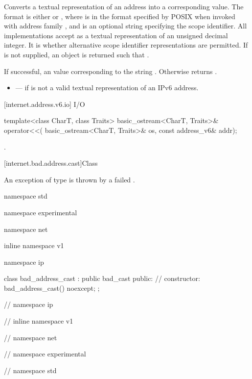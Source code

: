 \begin{itemdescr}
\pnum
\effects Converts a textual representation of an address into a corresponding  value. The format is either  or \tcode{\%}, where  is in the format specified by POSIX  when invoked with address family , and  is an optional string specifying the scope identifier. All implementations accept as  a textual representation of an unsigned decimal integer. It is  whether alternative scope identifier representations are permitted. If  is not supplied, an  object is returned such that .

\pnum
\returns If successful, an  value corresponding to the string . Otherwise returns .

\pnum
\errors
\begin{itemize}
\item
{} --- if  is not a valid textual representation of an IPv6 address.
\end{itemize}
\end{itemdescr}



[internet.address.v6.io]{ I/O}

%
\begin{itemdecl}
template<class CharT, class Traits>
  basic_ostream<CharT, Traits>& operator<<(
    basic_ostream<CharT, Traits>& os, const address_v6& addr);
\end{itemdecl}

\begin{itemdescr}
\pnum
\returns {}.
\end{itemdescr}




%
[internet.bad.address.cast]{Class }

\pnum
An exception of type  is thrown by a failed .

\begin{codeblock}
namespace std {
namespace experimental {
namespace net {
inline namespace v1 {
namespace ip {

  class bad_address_cast : public bad_cast
  {
  public:
    // constructor:
    bad_address_cast() noexcept;
  };

} // namespace ip
} // inline namespace v1
} // namespace net
} // namespace experimental
} // namespace std
\end{codeblock}

